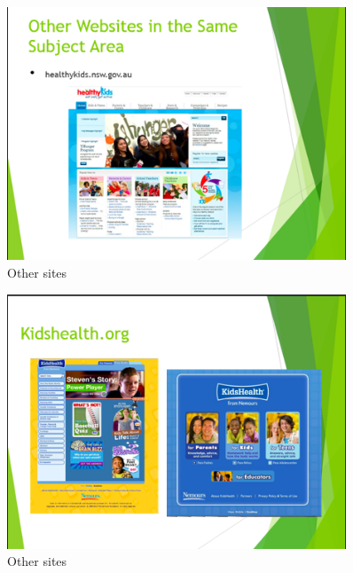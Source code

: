 \documentclass[letterpaper,12pt]{article}
\begin{document}
\begin{figure}[ht!]
  \centering
  \includegraphics[width=0.9\textwidth]{assets/jpg/othersite_1}
  \caption{Other sites}
  \label{fig:othersites}
\end{figure}
\FloatBarrier

\begin{figure}[ht!]
  \centering
  \includegraphics[width=0.9\textwidth]{assets/jpg/othersite_2}
  \caption{Other sites}
  \label{fig:othersites}
\end{figure}
\FloatBarrier
\end{document}
